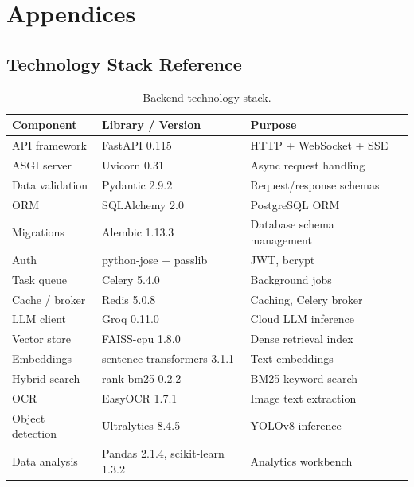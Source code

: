 \chapter{Appendices}
\label{chap:appendix}

\section{Technology Stack Reference}
\label{sec:tech-stack}

\begin{table}[ht]
    \centering
    \caption{Backend technology stack.}
    \label{tab:backend-stack}
    \begin{tabular}{llll}
        \toprule
        \textbf{Component} & \textbf{Library / Version} & \textbf{Purpose} \\
        \midrule
        API framework       & FastAPI 0.115         & HTTP + WebSocket + SSE \\
        ASGI server         & Uvicorn 0.31          & Async request handling \\
        Data validation     & Pydantic 2.9.2        & Request/response schemas \\
        ORM                 & SQLAlchemy 2.0        & PostgreSQL ORM \\
        Migrations          & Alembic 1.13.3        & Database schema management \\
        Auth                & python-jose + passlib & JWT, bcrypt \\
        Task queue          & Celery 5.4.0          & Background jobs \\
        Cache / broker      & Redis 5.0.8           & Caching, Celery broker \\
        LLM client          & Groq 0.11.0           & Cloud LLM inference \\
        Vector store        & FAISS-cpu 1.8.0       & Dense retrieval index \\
        Embeddings          & sentence-transformers 3.1.1 & Text embeddings \\
        Hybrid search       & rank-bm25 0.2.2       & BM25 keyword search \\
        OCR                 & EasyOCR 1.7.1         & Image text extraction \\
        Object detection    & Ultralytics 8.4.5     & YOLOv8 inference \\
        Data analysis       & Pandas 2.1.4, scikit-learn 1.3.2 & Analytics workbench \\

\end{tabular}
\end{table}
